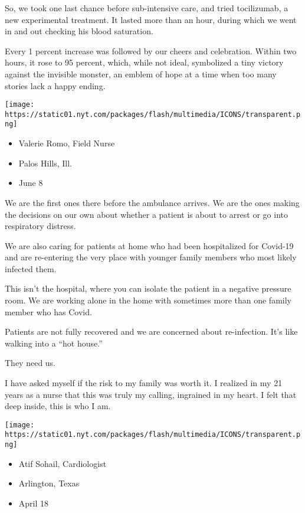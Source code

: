 So, we took one last chance before sub-intensive care, and tried
tocilizumab, a new experimental treatment. It lasted more than an hour,
during which we went in and out checking his blood saturation.

Every 1 percent increase was followed by our cheers and celebration.
Within two hours, it rose to 95 percent, which, while not ideal,
symbolized a tiny victory against the invisible monster, an emblem of
hope at a time when too many stories lack a happy ending.

\texttt{[image: https://static01.nyt.com/packages/flash/multimedia/ICONS/transparent.png]}

\begin{itemize}
\tightlist
\item
  Valerie Romo, Field Nurse
\item
  Palos Hills, Ill.
\item
  June 8
\end{itemize}

We are the first ones there before the ambulance arrives. We are the
ones making the decisions on our own about whether a patient is about to
arrest or go into respiratory distress.

We are also caring for patients at home who had been hospitalized for
Covid-19 and are re-entering the very place with younger family members
who most likely infected them.

This isn't the hospital, where you can isolate the patient in a negative
pressure room. We are working alone in the home with sometimes more than
one family member who has Covid.

Patients are not fully recovered and we are concerned about
re-infection. It's like walking into a ``hot house.''

They need us.

I have asked myself if the risk to my family was worth it. I realized in
my 21 years as a nurse that this was truly my calling, ingrained in my
heart. I felt that deep inside, this is who I am.

\texttt{[image: https://static01.nyt.com/packages/flash/multimedia/ICONS/transparent.png]}

\begin{itemize}
\tightlist
\item
  Atif Sohail, Cardiologist
\item
  Arlington, Texas
\item
  April 18
\end{itemize}

